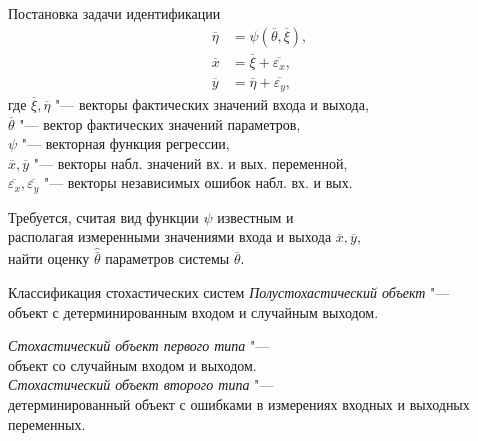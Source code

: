 \documentclass[hyperref={pdftex,unicode}]{beamer}
\begin{document}
\begin{frame}
  \maketitle
\end{frame}

\addtocounter{framenumber}{-1}

\begin{frame}{Постановка задачи идентификации}
  \begin{align*}
    \overline{\eta} &= \psi (\overline{\theta}, \overline{\xi}), \\
    \overline{x} &= \overline{\xi} + \overline{\varepsilon_x}, \\
    \overline{y} &= \overline{\eta} + \overline{\varepsilon_y},
  \end{align*}
  где \( \overline{\xi}, \overline{\eta} \)
  "--- векторы фактических значений входа и выхода, \\
  \hspace{10.5mm}\( \overline{\theta} \)
  "--- вектор фактических значений параметров, \\
  \hspace{10mm}\( \psi \)
  "--- векторная функция регрессии, \\
  \hspace{7mm}\( \overline{x}, \overline{y} \)
  "--- векторы набл. значений вх. и вых. переменной, \\
  \hspace{4mm}\( \overline{\varepsilon_x}, \overline{\varepsilon_y} \)
  "--- векторы независимых ошибок набл. вх. и вых.

  \bigskip
  Требуется, считая вид функции \( \psi \) известным и \\
  располагая измеренными значениями входа и выхода \( \overline{x}, \overline{y} \), \\
  найти оценку \( \hat{\overline{\theta}} \) параметров системы \( \overline{\theta} \).
\end{frame}

\begin{frame}{Классификация стохастических систем}
  \emph{Полустохастический объект} "--- \\
  объект с детерминированным входом и случайным выходом.

  \bigskip
  \emph{Стохастический объект первого типа} "--- \\
  объект со случайным входом и выходом. \\

  \bigskip
  \emph{Стохастический объект второго типа} "--- \\
  детерминированный объект с ошибками в измерениях входных и выходных переменных.
\end{frame}
\end{document}
